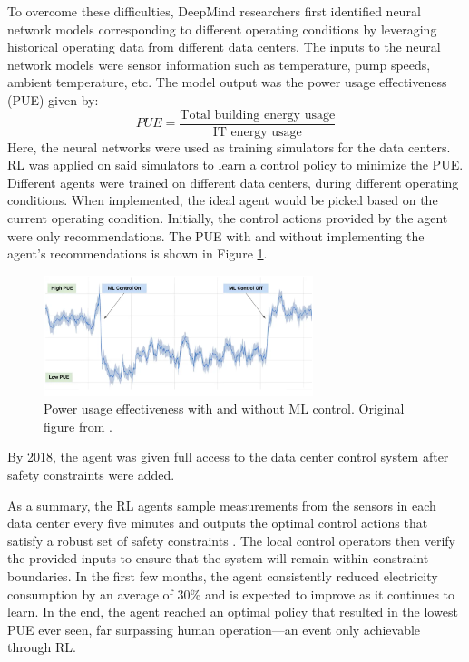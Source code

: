 To overcome these difficulties, DeepMind researchers first identified neural network models corresponding to different operating conditions by leveraging historical operating data from different data centers.  The inputs to the neural network models were sensor information such as temperature, pump speeds, ambient temperature, etc. The model output was the power usage effectiveness (PUE) given by:
\begin{equation}
    PUE = \frac{\text{Total building energy usage}}{\text{IT energy usage}}
    \label{eq:pue}
\end{equation}
Here, the neural networks were used as training simulators for the data centers. RL was applied on said simulators to learn a control policy to minimize the PUE. Different agents were trained on different data centers, during different operating conditions. When implemented, the ideal agent would be picked based on the current operating condition. Initially, the control actions provided by the agent were only recommendations.  The PUE with and without implementing the agent's recommendations is shown in Figure \ref{fig:google_data_center}.

\begin{figure}[H]
    \centering
    \includegraphics[width=0.7\textwidth]{images/ch5/google_data_center.jpeg}
    \caption{Power usage effectiveness with and without ML control.  Original figure from \cite{google_data1}.}
    \label{fig:google_data_center}
\end{figure}

By 2018, the agent was given full access to the data center control system after safety constraints were added. 

As a summary, the RL agents sample measurements from the sensors in each data center every five minutes and outputs the optimal control actions that satisfy a robust set of safety constraints \cite{google_data2}. The local control operators then verify the provided inputs to ensure that the system will remain within constraint boundaries. In the first few months, the agent consistently reduced electricity consumption by an average of 30\% and is expected to improve as it continues to learn. In the end, the agent reached an optimal policy that resulted in the lowest PUE ever seen, far surpassing human operation---an event only achievable through RL.
